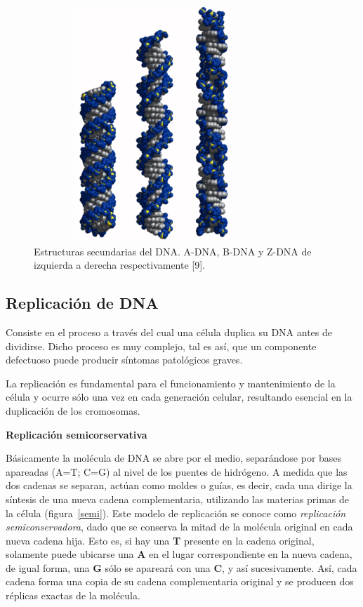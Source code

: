 \begin{figure} [h]
  		\hspace*{2cm}\includegraphics[width=3.5209in,height=3.5000in]{image/estructuraSecDNA.png}
   		\caption{Estructuras secundarias del DNA. A-DNA, B-DNA y Z-DNA de izquierda a derecha respectivamente [9].}
   		\label{estrucDNA}
\end{figure}	

\subsection{Replicación de DNA}
\par Consiste en el proceso a través del cual una célula duplica su DNA antes de dividirse. Dicho proceso es muy complejo, tal es así, que un componente defectuoso puede producir síntomas patológicos graves. 
\par La replicación es fundamental para el funcionamiento y mantenimiento de la célula y ocurre sólo una vez en cada generación celular, resultando esencial en la duplicación de los cromosomas.

\vskip 0.5cm
\noindent \textbf{Replicación semicorservativa}
\vskip 0.025cm

Básicamente la molécula de DNA se abre por el medio, separándose por bases apareadas (A=T; C=G) al nivel de los puentes de hidrógeno. A medida que las dos cadenas se separan, actúan como moldes o guías, es decir, cada una dirige la síntesis de una nueva cadena complementaria, utilizando las materias primas de la célula (figura~\ref{semi}).
Este modelo de replicación se conoce como \textit{replicación semiconservadora}, dado que se conserva la mitad de la molécula original en cada nueva cadena hija. Esto es, si hay una \textbf{T} presente en la cadena original, solamente puede ubicarse una \textbf{A} en el lugar correspondiente en la nueva cadena, de igual forma, una \textbf{G} sólo se apareará con una \textbf{C}, y así sucesivamente. Así, cada cadena forma una copia de su cadena complementaria original y se producen dos réplicas exactas de la molécula.

